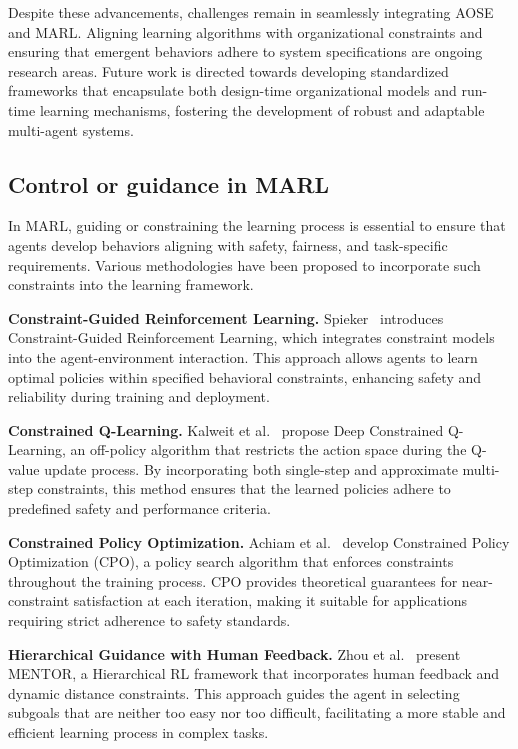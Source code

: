 \documentclass[pdflatex,sn-mathphys-num]{sn-jnl}%
\theoremstyle{thmstyleone}%
\theoremstyle{thmstyletwo}%
\theoremstyle{thmstylethree}%
\begin{document}
Despite these advancements, challenges remain in seamlessly integrating AOSE and MARL. Aligning learning algorithms with organizational constraints and ensuring that emergent behaviors adhere to system specifications are ongoing research areas. Future work is directed towards developing standardized frameworks that encapsulate both design-time organizational models and run-time learning mechanisms, fostering the development of robust and adaptable multi-agent systems.


\subsection{Control or guidance in MARL}\label{sub-sec:rel_control}

In MARL, guiding or constraining the learning process is essential to ensure that agents develop behaviors aligning with safety, fairness, and task-specific requirements. Various methodologies have been proposed to incorporate such constraints into the learning framework.

\textbf{Constraint-Guided Reinforcement Learning.} Spieker~\cite{spieker2021constraint} introduces Constraint-Guided Reinforcement Learning, which integrates constraint models into the agent-environment interaction. This approach allows agents to learn optimal policies within specified behavioral constraints, enhancing safety and reliability during training and deployment.

\textbf{Constrained Q-Learning.} Kalweit et al.~\cite{kalweit2020deep} propose Deep Constrained Q-Learning, an off-policy algorithm that restricts the action space during the Q-value update process. By incorporating both single-step and approximate multi-step constraints, this method ensures that the learned policies adhere to predefined safety and performance criteria.

\textbf{Constrained Policy Optimization.} Achiam et al.~\cite{achiam2017constrained} develop Constrained Policy Optimization (CPO), a policy search algorithm that enforces constraints throughout the training process. CPO provides theoretical guarantees for near-constraint satisfaction at each iteration, making it suitable for applications requiring strict adherence to safety standards.

\textbf{Hierarchical Guidance with Human Feedback.} Zhou et al.~\cite{zhou2024mentor} present MENTOR, a Hierarchical RL framework that incorporates human feedback and dynamic distance constraints. This approach guides the agent in selecting subgoals that are neither too easy nor too difficult, facilitating a more stable and efficient learning process in complex tasks.
\end{document}
